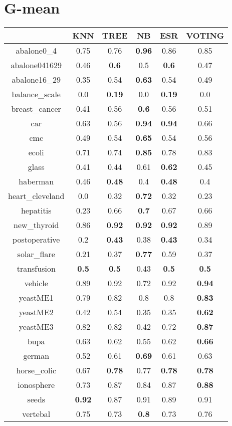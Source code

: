 \documentclass{article}%
\begin{document}
%
\section*{G{-}mean}%
\begin{tabular}{c|ccccc}%
\hline%
&KNN&TREE&NB&ESR&VOTING\\%
\hline%
abalone0\_4&0.75&0.76&\textbf{0.96}&0.86&0.85\\%
\hline%
abalone041629&0.46&\textbf{0.6}&0.5&\textbf{0.6}&0.47\\%
\hline%
abalone16\_29&0.35&0.54&\textbf{0.63}&0.54&0.49\\%
\hline%
balance\_scale&0.0&\textbf{0.19}&0.0&\textbf{0.19}&0.0\\%
\hline%
breast\_cancer&0.41&0.56&\textbf{0.6}&0.56&0.51\\%
\hline%
car&0.63&0.56&\textbf{0.94}&\textbf{0.94}&0.66\\%
\hline%
cmc&0.49&0.54&\textbf{0.65}&0.54&0.56\\%
\hline%
ecoli&0.71&0.74&\textbf{0.85}&0.78&0.83\\%
\hline%
glass&0.41&0.44&0.61&\textbf{0.62}&0.45\\%
\hline%
haberman&0.46&\textbf{0.48}&0.4&\textbf{0.48}&0.4\\%
\hline%
heart\_cleveland&0.0&0.32&\textbf{0.72}&0.32&0.23\\%
\hline%
hepatitis&0.23&0.66&\textbf{0.7}&0.67&0.66\\%
\hline%
new\_thyroid&0.86&\textbf{0.92}&\textbf{0.92}&\textbf{0.92}&0.89\\%
\hline%
postoperative&0.2&\textbf{0.43}&0.38&\textbf{0.43}&0.34\\%
\hline%
solar\_flare&0.21&0.37&\textbf{0.77}&0.59&0.37\\%
\hline%
transfusion&\textbf{0.5}&\textbf{0.5}&0.43&\textbf{0.5}&\textbf{0.5}\\%
\hline%
vehicle&0.89&0.92&0.72&0.92&\textbf{0.94}\\%
\hline%
yeastME1&0.79&0.82&0.8&0.8&\textbf{0.83}\\%
\hline%
yeastME2&0.42&0.54&0.35&0.35&\textbf{0.62}\\%
\hline%
yeastME3&0.82&0.82&0.42&0.72&\textbf{0.87}\\%
\hline%
bupa&0.63&0.62&0.55&0.62&\textbf{0.66}\\%
\hline%
german&0.52&0.61&\textbf{0.69}&0.61&0.63\\%
\hline%
horse\_colic&0.67&\textbf{0.78}&0.77&\textbf{0.78}&\textbf{0.78}\\%
\hline%
ionosphere&0.73&0.87&0.84&0.87&\textbf{0.88}\\%
\hline%
seeds&\textbf{0.92}&0.87&0.91&0.89&0.91\\%
\hline%
vertebal&0.75&0.73&\textbf{0.8}&0.73&0.76\\%
\hline%
\end{tabular}

%
\end{document}
